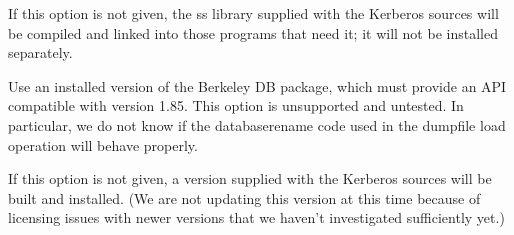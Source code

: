 \documentclass[letterpaper,10pt,english]{sphinxmanual}
\begin{document}
\begin{description}
\sphinxAtStartPar
If this option is not given, the ss library supplied with the
Kerberos sources will be compiled and linked into those programs
that need it; it will not be installed separately.

\item[{\sphinxstylestrong{\sphinxhyphen{}}\sphinxstylestrong{\sphinxhyphen{}with\sphinxhyphen{}system\sphinxhyphen{}db}}] \leavevmode
\sphinxAtStartPar
Use an installed version of the Berkeley DB package, which must
provide an API compatible with version 1.85.  This option is
unsupported and untested.  In particular, we do not know if the
database\sphinxhyphen{}rename code used in the dumpfile load operation will
behave properly.

\sphinxAtStartPar
If this option is not given, a version supplied with the Kerberos
sources will be built and installed.  (We are not updating this
version at this time because of licensing issues with newer
versions that we haven’t investigated sufficiently yet.)

\end{description}
\end{document}
